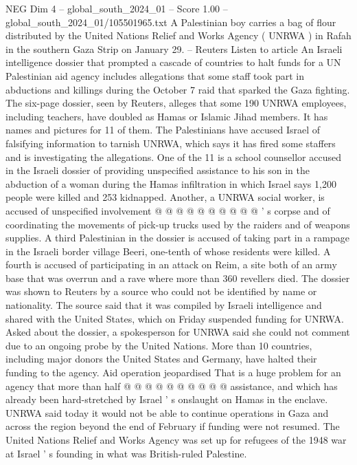\begin{textsample}{NEG Dim 4 – global\_south\_2024\_01 – Score 1.00 – global\_south\_2024\_01/105501965.txt}  \label{ex:f4_neg_088}
A Palestinian boy carries a bag of flour distributed by the United Nations Relief and Works Agency ( UNRWA ) in Rafah in the southern Gaza Strip on January 29. -- Reuters Listen to article An Israeli intelligence dossier that prompted a cascade of countries to halt funds for a UN Palestinian aid agency includes allegations that some staff took part in abductions and killings during the October 7 raid that sparked the Gaza fighting.
The six-page dossier, seen by Reuters, alleges that some 190 UNRWA employees, including teachers, have doubled as Hamas or Islamic Jihad members.
It has names and pictures for 11 of them.
The Palestinians have accused Israel of falsifying information to tarnish UNRWA, which says it has fired some staffers and is investigating the allegations.
One of the 11 is a school counsellor accused in the Israeli dossier of providing unspecified assistance to his son in the abduction of a woman during the Hamas infiltration in which Israel says 1,200 people were killed and 253 kidnapped.
Another, a UNRWA social worker, is accused of unspecified involvement @ @ @ @ @ @ @ @ @ @ ' s corpse and of coordinating the movements of pick-up trucks used by the raiders and of weapons supplies.
A third Palestinian in the dossier is accused of taking part in a rampage in the Israeli border village Beeri, one-tenth of whose residents were killed.
A fourth is accused of participating in an attack on Reim, a site both of an army base that was overrun and a rave where more than 360 revellers died.
The dossier was shown to Reuters by a source who could not be identified by name or nationality.
The source said that it was compiled by Israeli intelligence and shared with the United States, which on Friday suspended funding for UNRWA.
Asked about the dossier, a spokesperson for UNRWA said she could not comment due to an ongoing probe by the United Nations.
More than 10 countries, including major donors the United States and Germany, have halted their funding to the agency.
Aid operation jeopardised That is a huge problem for an agency that more than half @ @ @ @ @ @ @ @ @ @ assistance, and which has already been hard-stretched by Israel ' s onslaught on Hamas in the enclave.
UNRWA said today it would not be able to continue operations in Gaza and across the region beyond the end of February if funding were not resumed.
The United Nations Relief and Works Agency was set up for refugees of the 1948 war at Israel ' s founding in what was British-ruled Palestine.

\end{textsample}
